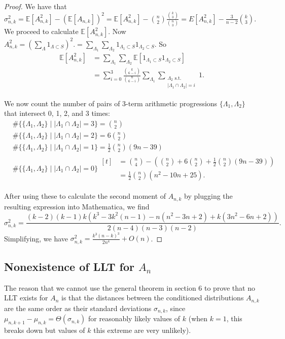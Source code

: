\documentclass[12pt]{article} %
\newcommand{\p}[1]{\left(#1\right)}
\newcommand{\abs}[1]{\left\lvert#1\right\rvert}
\newcommand{\E}{\mathbb{E}}
\theoremstyle{definition}
\theoremstyle{definition}
\begin{document}
\begin{proof}
We have that $\sigma_{n,k}^2 = \E[A_{n,k}^2] - (\E[A_{n,k}])^2 = \E[A_{n,k}^2] - {n\choose 2}\frac{{k\choose 3}}{{n\choose 3}} = E[A_{n,k}^2] - \frac{3}{n-2} {k\choose 3}.$ We proceed to calculate $\E[A_{n,k}^2]$. Now $A_{n,k}^2 = (\sum_{\Lambda} 1_{\Lambda \subset S})^2. = \sum_{\Lambda_1}\sum_{\Lambda_2} 1_{\Lambda_1 \subset S} 1_{\Lambda_2 \subset S}.$ So 
\begin{align*}
\E[A_{n,k}^2] &= \sum_{\Lambda_1}\sum_{\Lambda_2} \E[1_{\Lambda_1 \subset S} 1_{\Lambda_2 \subset S}] \\
&= \sum_{i = 0}^3 \frac{{k\choose{6-i}}}{{n\choose{6-i}}} \sum_{\Lambda_1}\sum_{\substack{\Lambda_2 \textrm{ s.t. } \\ \abs{\Lambda_1 \cap \Lambda_2} = i}} 1.
\end{align*}

We now count the number of pairs of 3-term arithmetic progressions $\{\Lambda_1, \Lambda_2\}$ that intersect 0, 1, 2, and 3 times:
\begin{align*}
&\#\{\{\Lambda_1, \Lambda_2\} \mid \abs{\Lambda_1 \cap \Lambda_2} = 3\} = {n\choose 2} \\ 
&\#\{\{\Lambda_1, \Lambda_2\} \mid \abs{\Lambda_1 \cap \Lambda_2} = 2\} = 6{n\choose 2} \\
&\#\{\{\Lambda_1, \Lambda_2\} \mid \abs{\Lambda_1 \cap \Lambda_2} = 1\} = \frac{1}{2}{n\choose2}(9n-39) \\
&\#\{\{\Lambda_1, \Lambda_2\} \mid \abs{\Lambda_1 \cap \Lambda_2} = 0\} 
\begin{aligned}[t]
&= {n\choose4} - \p{{n\choose 2}+6{n\choose 2}+\frac{1}{2}{n\choose2}(9n-39)} \\
&= \frac{1}{2}{n\choose 2}(n^2-10n+25).
\end{aligned}
\end{align*} 

After using these to calculate the second moment of $A_{n,k}$ by plugging the resulting expression into Mathematica, we find
\[ \sigma_{n,k}^2 = \frac{(k-2)(k-1)k(k^3-3k^2(n-1) - n(n^2-3n+2)+k(3n^2-6n+2))}{2(n-4)(n-3)(n-2)}. \]
Simplifying, we have $\sigma_{n,k}^2 = \frac{k^3(n-k)^3}{2n^4} + O(n)$.
\end{proof}


\subsection{Nonexistence of LLT for $A_n$}
The reason that we cannot use the general theorem in section 6 to prove that no LLT exists for $A_n$ is that the distances between the conditioned distributions $A_{n,k}$ are the same order as their standard deviations $\sigma_{n,k}$, since $\mu_{n,k+1} - \mu_{n,k} = \Theta(\sigma_{n,k})$ for reasonably likely values of $k$ (when $k=1$, this breaks down but values of $k$ this extreme are very unlikely).
\end{document}
